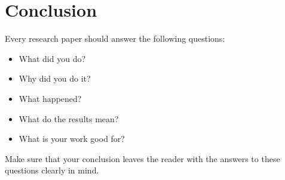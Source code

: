 \section{Conclusion}

Every research paper should answer the following questions:

\begin{itemize}
\item What did you do?
\item Why did you do it?
\item What happened?
\item What do the results mean?
\item What is your work good for?
\end{itemize}

Make sure that your conclusion leaves the reader with the answers
to these questions clearly in mind.

